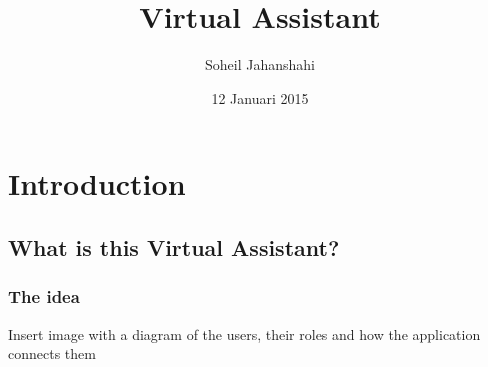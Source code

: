\documentclass{beamer}
\title[Beamer Sample]{Virtual Assistant}
\institute[TU Delft]{Delft University of Technology Library}
\author{Soheil Jahanshahi}
\date{12 Januari 2015}
\begin{document}
{
%
\frame{\titlepage}
}

{
}

\section{Introduction}
\subsection{What is this Virtual Assistant?}

\begin{frame}\frametitle{The idea}
	Insert image with a diagram of the users, their roles and how the application connects them
\end{frame}

\end{document}
